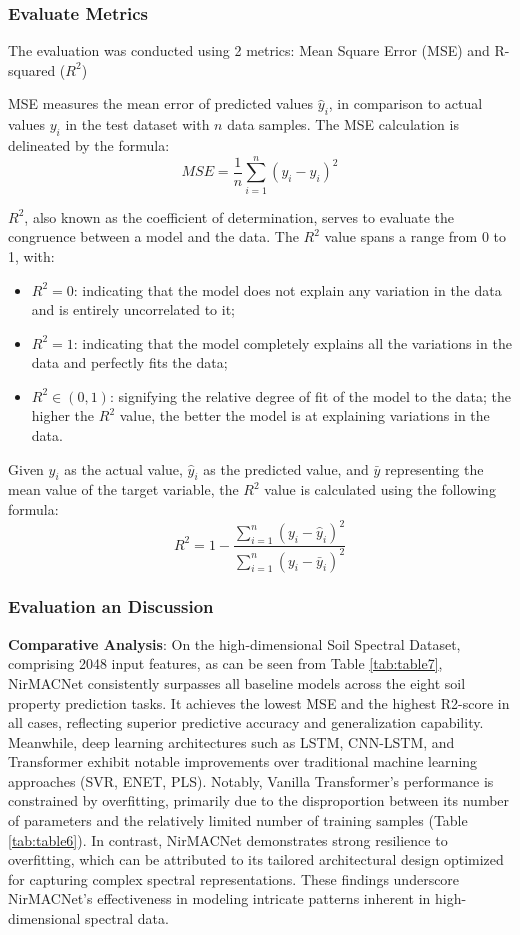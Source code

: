 \documentclass[10pt, a4paper, oneside]{article}
\begin{document}
\subsubsection{Evaluate Metrics}
The evaluation was conducted using 2 metrics: Mean Square Error (MSE) and R-squared ($R^2$)

MSE measures the mean error of predicted values $\hat{y}_i$, in comparison to actual values $y_i$ in the test dataset with $n$ data samples. The MSE calculation is delineated by the formula:
\begin{equation}
    MSE = \frac{1}{n} \sum_{i=1}^{n} (y_i - \hat{y}_i)^2
\end{equation}

$R^2$, also known as the coefficient of determination, serves to evaluate the congruence between a model and the data. The $R^2$ value spans a range from 0 to 1, with:
\begin{itemize}
    \item $R^2 = 0$: indicating that the model does not explain any variation in the data and is entirely uncorrelated to it;
    \item $R^2 = 1$: indicating that the model completely explains all the variations in the data and perfectly fits the data;
    \item $R^2 \in (0, 1)$: signifying the relative degree of fit of the model to the data; the higher the $R^2$ value, the better the model is at explaining variations in the data.
\end{itemize}

Given $y_i$ as the actual value, $\hat{y}_i$ as the predicted value, and $\bar{y}$ representing the mean value of the target variable, the $R^2$ value is calculated using the following formula:
\begin{equation}
    R^2 = 1 - \frac{\sum_{i=1}^{n} (y_i - \hat{y}_i)^2}{\sum_{i=1}^{n} (y_i - \bar{y}_i)^2}
\end{equation}

\subsubsection{Evaluation an Discussion}
\textbf{Comparative Analysis}: On the high-dimensional Soil Spectral Dataset, comprising 2048 input features, as can be seen from Table \ref{tab:table7}, NirMACNet consistently surpasses all baseline models across the eight soil property prediction tasks. It achieves the lowest MSE and the highest R2-score in all cases, reflecting superior predictive accuracy and generalization capability. Meanwhile, deep learning architectures such as LSTM, CNN-LSTM, and Transformer exhibit notable improvements over traditional machine learning approaches (SVR, ENET, PLS). Notably, Vanilla Transformer's performance is constrained by overfitting, primarily due to the disproportion between its number of parameters and the relatively limited number of training samples (Table \ref{tab:table6}). In contrast, NirMACNet demonstrates strong resilience to overfitting, which can be attributed to its tailored architectural design optimized for capturing complex spectral representations. These findings underscore NirMACNet’s effectiveness in modeling intricate patterns inherent in high-dimensional spectral data.
\end{document}
